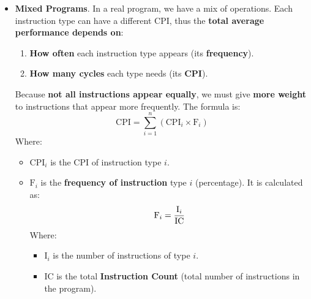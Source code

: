 \begin{itemize}
  \item \textbf{Mixed Programs}. In a real program, we have a mix of operations. Each instruction type can have a different CPI, thus the \textbf{total average performance depends on}:
  \begin{enumerate}
    \item \textbf{How often} each instruction type appears (its \textbf{frequency}).
    \item \textbf{How many cycles} each type needs (its \textbf{CPI}).
  \end{enumerate}
  Because \textbf{not all instructions appear equally}, we must give \textbf{more weight} to instructions that appear more frequently. The  formula is:
  \begin{equation}\label{eq: Weighted Average CPI}
    \text{CPI} = \displaystyle\sum_{i=1}^{n} \left(\text{CPI}_{i} \times \text{F}_{i}\right)
  \end{equation}
  Where:
  \begin{itemize}
    \item $\text{CPI}_{i}$ is the CPI of instruction type $i$.
    \item $\text{F}_{i}$ is the \textbf{frequency of instruction} type $i$ (percentage). It is calculated as:
    \begin{equation}\index{Formula: Instruction Frequency}
      \text{F}_{i} = \dfrac{\text{I}_{i}}{\text{IC}}
    \end{equation}
    Where:
    \begin{itemize}
      \item $\text{I}_{i}$ is the number of instructions of type $i$.
      \item $\text{IC}$ is the total \textbf{Instruction Count} (total number of instructions in the program).
    \end{itemize}
  \end{itemize}
\end{itemize}

